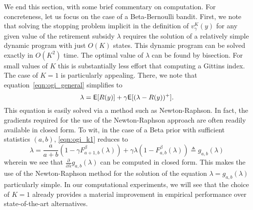 We end this section, with some brief commentary on computation. For concreteness, let us focus on the case of a Beta-Bernoulli bandit. First, we note that solving the stopping problem implicit in the definition of $v^K_\gamma(y)$ for any given value of the retirement subsidy $\lambda$ requires the solution of a relatively simple dynamic program with just $O(K)$ states. This dynamic program can be solved exactly in $O(K^2)$ time. The optimal value of $\lambda$ can be found by bisection. For small values of $K$ this is substantially less effort that computing a Gittins index. The case of $K=1$ is particularly appealing. There, we note that equation~\eqref{eqn:ogi_general} simplifies to
\begin{equation} \label{eqn:ogi_k1}
\lambda = \mathsf{E}[R(y)] + \gamma \mathsf{E}[(\lambda - R(y))^+].
\end{equation}
This equation is easily solved via a method such as Newton-Raphson. In fact, the gradients required for the use of the Newton-Raphson approach are often readily available in closed form. To wit, in the case of a Beta prior with sufficient statistics $(a,b)$, \eqref{eqn:ogi_k1} reduces to
\[
	\lambda  =  \frac{a}{a+b}\left(1 - \gamma F^\beta_{a+1,b}(\lambda)\right) + \gamma \lambda \left(1-F^\beta_{a,b}(\lambda)\right) \triangleq g_{a,b}(\lambda)
\]
wherein we see that $\frac{\partial}{\partial \lambda} g_{a,b}(\lambda)$ can be computed in closed form. This makes the use of the Newton-Raphson method for the solution of the equation $\lambda =  g_{a,b}(\lambda)$ particularly simple. In our computational experiments, we will see that the choice of $K=1$ already provides a material improvement in empirical performance over state-of-the-art alternatives. 



